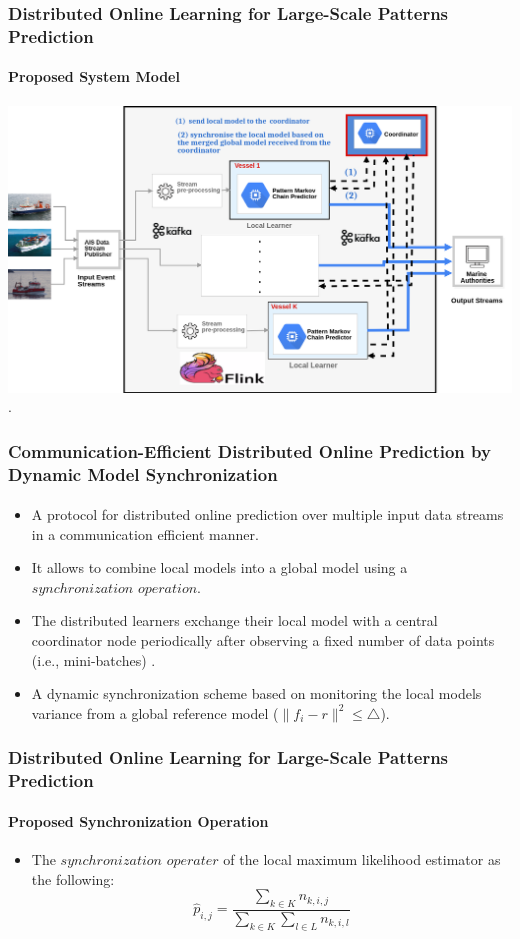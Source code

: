 \frame
{
	\frametitle{Distributed Online Learning for Large-Scale Patterns Prediction}
	\framesubtitle{Proposed System Model}
	\begin{center}
		\includegraphics[width=1.05\textwidth,left]{figures/architecturedist_v2.png}\\
.
	\end{center}
}


\frame
{
	\frametitle{ Communication-Efficient Distributed Online Prediction by Dynamic Model Synchronization  }
	\framesubtitle{\citep{kamp2014communication}}
	\begin{itemize}[]
		\item<1-> A protocol for distributed online prediction over multiple input data streams in a communication efficient manner.
		\item<1-> It allows to combine local models into a global model
	using a $synchronization$ $ operation$.
		\item<1-> The distributed learners exchange their local model with a central coordinator node periodically after observing a fixed number of data points (i.e., mini-batches) \citep{dekel2012optimal}.
		
		\item<1-> A dynamic synchronization scheme based on monitoring the local models variance from a global reference model ($\|f_i - r\|^2 \leq \bigtriangleup$).
		
		
	\end{itemize}
}

\frame
{
	\frametitle{Distributed Online Learning for Large-Scale Patterns Prediction}
		\framesubtitle{Proposed Synchronization Operation}
	\begin{itemize}[]

	\item<1-> The
 $synchronization$ $ operater$ of the local maximum likelihood estimator as the following:
 \begin{equation*}
 \label{eq:pi_estim}
 \hat{p}_{i,j}=\frac{\sum_{k \in K} n_{k,i,j}}{\sum_{k \in K} \sum_{l \in L} n_{k,i,l}}
 \end{equation*}

	
\end{itemize}
}